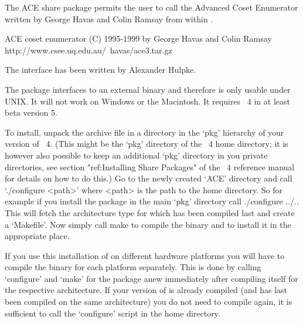 

The ACE share package permits the user to call the Advanced Coset 
Enumerator written by George Havas and Colin Ramsay from within {\GAP}. 

\begintt
ACE coset enumerator (C) 1995-1999 by George Havas and Colin Ramsay
    http://www.csee.uq.edu.au/~havas/ace3.tar.gz
\endtt

The {\GAP} interface has been written by Alexander Hulpke.

The package interfaces to an external binary and therefore is only usable
under UNIX. It will not work on Windows or the Macintosh. It requires
{\GAP}~4 in at least beta version 5.


To install, unpack the archive file in a directory in the `pkg' hierarchy of
your version of {\GAP}~4. (This might be the `pkg' directory of the
{\GAP}~4 home directory; it is however also possible to keep an additional
`pkg' directory in you private directories, see section "ref:Installing
Share Packages" of the {\GAP}~4 reference manual for details on how to do
this.) Go to the newly created `ACE' directory and call `./configure <path>'
where <path> is the path to the {\GAP} home directory. So for example if you
install the package in the main `pkg' directory call
\begintt
./configure ../..
\endtt
This will fetch the architecture type for which {\GAP} has been compiled last
and create a `Makefile'. 
Now simply call
\begintt
make
\endtt
to compile the binary and to install it in the appropriate place.

If you use this installation of {\GAP} on different hardware platforms you will
have to compile the binary for each platform separately. This is done by
calling `configure' and `make' for the package anew immediately after
compiling {\GAP} itself for the respective architecture.
If your version of {\GAP} is already compiled (and has last been compiled on
the same architecture) you do not need to compile {\GAP}
again, it is sufficient to call the `configure' script in the {\GAP} home
directory.

